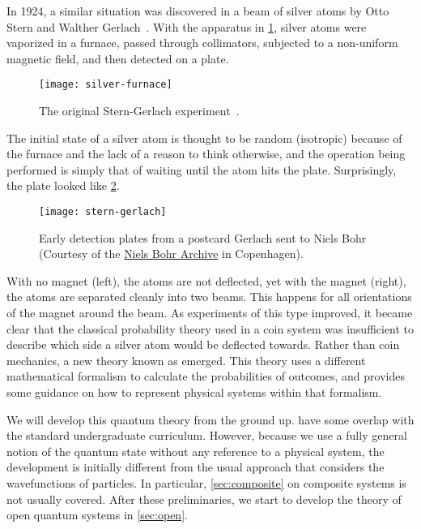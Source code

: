 \documentclass[../thesis.tex]{subfiles}
\begin{document}
In 1924, a similar situation was discovered in a beam of silver atoms by Otto
Stern and Walther Gerlach~\cite{gerlachUberRichtungsquantelungIm1924}. With the
apparatus in \cref{fig:silver-furnace}, silver atoms were vaporized in a
furnace, passed through collimators, subjected to a non-uniform magnetic field,
and then detected on a plate.
\begin{figure}[ht]
  \centering
  \texttt{[image: silver-furnace]}
  \caption{%
    The original Stern-Gerlach
    experiment~\cite{schmidt-bockingSternGerlachExperimentRevisited2016}.
  }\label{fig:silver-furnace}
\end{figure}
The initial state of a silver atom is thought to be random (isotropic) because
of the furnace and the lack of a reason to think otherwise, and the operation
being performed is simply that of waiting until the atom hits the plate.
Surprisingly, the plate looked like \cref{fig:stern-gerlach}.
\begin{figure}[ht]
  \centering
  \texttt{[image: stern-gerlach]}
  \caption{%
    Early detection plates from a postcard Gerlach sent to Niels Bohr
    {\small(Courtesy of the \href{https://www.nbarchive.dk}{Niels Bohr Archive}
    in Copenhagen)}.
  }\label{fig:stern-gerlach}
\end{figure}
With no magnet (left), the atoms are not deflected, yet with the magnet (right),
the atoms are separated cleanly into two beams. This happens for all
orientations of the magnet around the beam. As experiments of this type
improved, it became clear that the classical probability theory used in a coin
system was insufficient to describe which side a silver atom would be deflected
towards. Rather than coin mechanics, a new theory known as  emerged. This theory uses a different mathematical formalism to
calculate the probabilities of outcomes, and provides some guidance on how to
represent physical systems within that formalism.

We will develop this quantum theory from the ground up.
 have some overlap
with the standard undergraduate curriculum. However, because we use a fully
general notion of the quantum state without any reference to a physical system,
the development is initially different from the usual approach that considers
the wavefunctions of particles. In particular, \cref{sec:composite} on composite
systems is not usually covered. After these preliminaries, we start to develop
the theory of open quantum systems in \cref{sec:open}.
\end{document}
